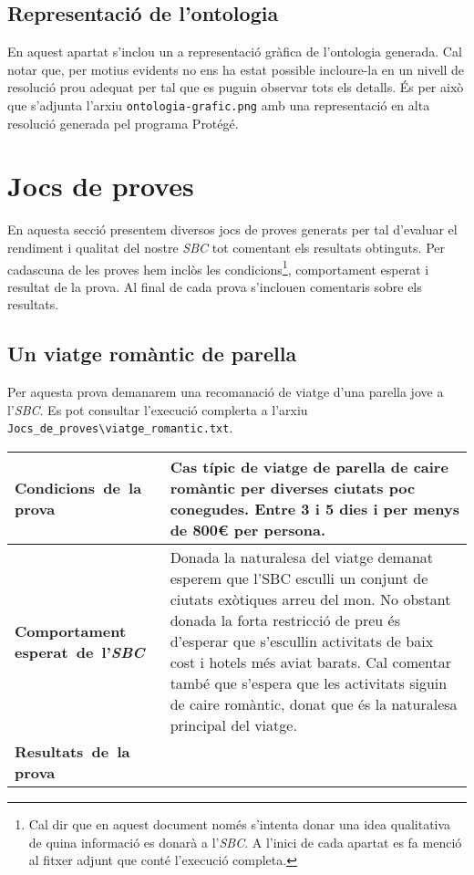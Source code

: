 \documentclass[11pt,a4paper]{article}
\begin{document}
\clearpage

\subsection{Representació de l'ontologia}
En aquest apartat s'inclou un a representació gràfica de l'ontologia generada. Cal notar que, per motius evidents no ens ha estat possible incloure-la en un nivell de resolució prou adequat per tal que es puguin observar tots els detalls. És per això que s'adjunta l'arxiu \texttt{ontologia-grafic.png} amb una representació en alta resolució generada pel programa Protégé.


\clearpage

\section{Jocs de proves}
En aquesta secció presentem diversos jocs de proves generats per tal d'evaluar el rendiment i qualitat del nostre \emph{SBC} tot comentant els resultats obtinguts. Per cadascuna de les proves hem inclòs les condicions\footnote{Cal dir que en aquest document només s'intenta donar una idea qualitativa de quina informació es donarà a l'\emph{SBC}. A l'inici de cada apartat es fa menció al fitxer adjunt que conté l'execució completa.}, comportament esperat i resultat de la prova. Al final de cada prova s'inclouen comentaris sobre els resultats.


\subsection{Un viatge romàntic de parella}

Per aquesta prova demanarem una recomanació de viatge d'una parella jove a l'\emph{SBC}. Es pot consultar l'execució complerta a l'arxiu \texttt{Jocs\_de\_proves\textbackslash viatge\_romantic.txt}.

\noindent
\begin{tabular}{|p{}|p{}|}
\hline
\textbf{\mbox{Condicions de la} \mbox{prova}} & Cas típic de viatge de parella de caire romàntic per diverses ciutats poc conegudes. Entre 3 i 5 dies i per menys de 800\euro{} per persona.\\
\hline
\textbf{Comportament \mbox{esperat de l'\emph{SBC}}} & Donada la naturalesa del viatge demanat esperem que l'SBC esculli un conjunt de ciutats exòtiques arreu del mon. No obstant donada la forta restricció de preu és d'esperar que s'escullin activitats de baix cost i hotels més aviat barats. Cal comentar també que s'espera que les activitats siguin de caire romàntic, donat que és la naturalesa principal del viatge. \\
\hline
\textbf{\mbox{Resultats de la} \mbox{prova}} & \\
\hline
\end{tabular}
\end{document}
